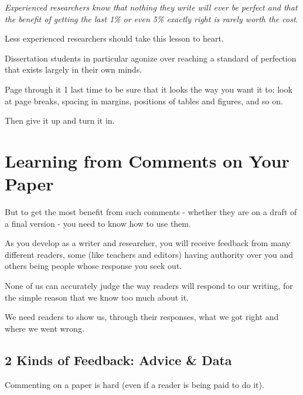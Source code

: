\documentclass[oneside]{book}
\numberwithin{equation}{section}
\begin{document}
\textit{Experienced researchers know that nothing they write will ever be perfect and that the benefit of getting the last 1\% or even 5\% exactly right is rarely worth the cost}.

Less experienced researchers should take this lesson to heart.

Dissertation students in particular agonize over reaching a standard of perfection that exists largely in their own minds.



%
Page through it 1 last time to be sure that it looks the way you want it to: look at page breaks, spacing in margins, positions of tables and figures, and so on.

Then give it up and turn it in.


\chapter{Learning from Comments on Your Paper}


But to get the most benefit from such comments - whether they are on a draft of a final version - you need to know how to use them.

%
As you develop as a writer and researcher, you will receive feedback from many different readers, some (like teachers and editors) having authority over you and others being people whose response you seek out.


None of us can accurately judge the way readers will respond to our writing, for the simple reason that we know too much about it.

We need readers to show us, through their responses, what we got right and where we went wrong.

\section{2 Kinds of Feedback: Advice \& Data}
Commenting on a paper is hard (even if a reader is being paid to do it).
\end{document}
